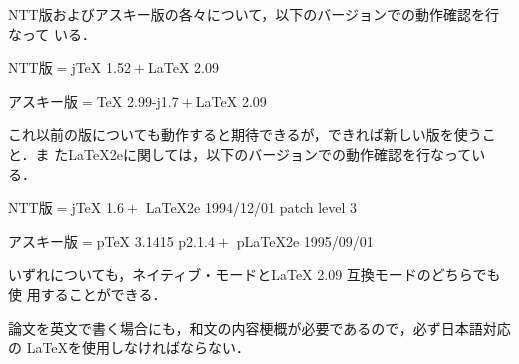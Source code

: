 \documentclass{kuisthesis}			%
\def\LATEXe{\ifx\LaTeXe\undefined \LaTeX 2e\else\LaTeXe\fi}
\begin{document}
NTT版およびアスキー版の各々について，以下のバージョンでの動作確認を行なって
いる．
\begin{ITEMIZE}%
\item
NTT版${}={}${j\TeX} 1.52${}+{}${\LaTeX} 2.09
\item 
アスキー版${}={}${\TeX} 2.99-j1.7${}+{}${\LaTeX} 2.09
\end{ITEMIZE}%
これ以前の版についても動作すると期待できるが，できれば新しい版を使うこと．ま
た{\LATEXe}に関しては，以下のバージョンでの動作確認を行なっている．
\begin{ITEMIZE}%
\item
NTT版${}={}${j\TeX} 1.6${}+{}$%
	{\LATEXe} 1994/12/01 patch level 3
\item 
アスキー版${}={}${p\TeX} 3.1415 p2.1.4${}+{}$%
	{p\LATEXe} 1995/09/01
\end{ITEMIZE}%
いずれについても，ネイティブ・モードと{\LaTeX} 2.09 互換モードのどちらでも使
用することができる．

論文を英文で書く場合にも，和文の内容梗概が必要であるので，必ず日本語対応の
\LaTeX を使用しなければならない．

\end{document}
